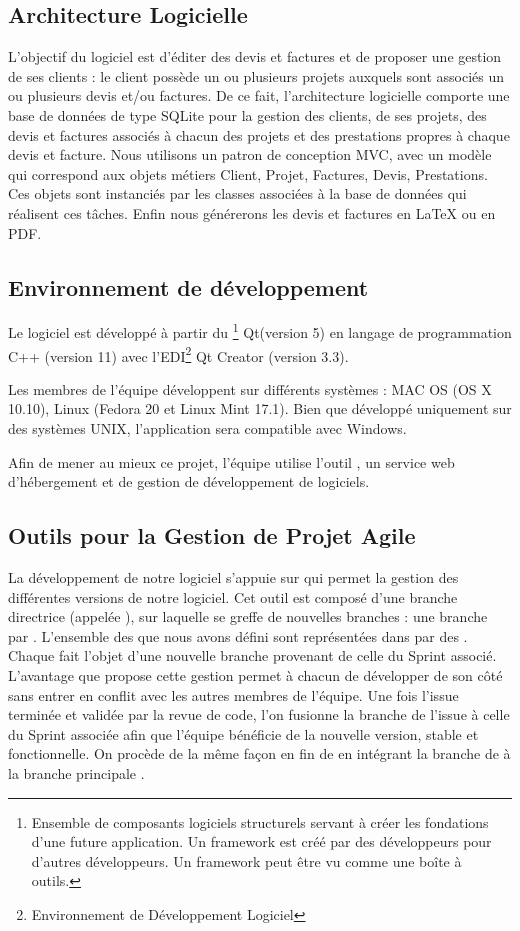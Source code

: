 \subsection{Architecture Logicielle}
L’objectif du logiciel est d’éditer des devis et factures et de proposer une gestion de ses clients : le client possède un ou plusieurs projets auxquels sont associés un ou plusieurs devis et/ou factures. 
De ce fait, l’architecture logicielle comporte une base de données de type SQLite pour la gestion des clients, de ses projets, des devis et factures associés à chacun des projets et des prestations propres à chaque devis et facture. 
Nous utilisons un patron de conception MVC, avec un modèle qui correspond aux objets métiers Client, Projet, Factures, Devis, Prestations. Ces objets sont instanciés par les classes associées à la base de données qui réalisent ces tâches.
Enfin nous générerons les devis et factures en LaTeX ou en PDF.

\subsection{Environnement de développement}
Le logiciel est développé à partir du 
\footnote{Ensemble de composants logiciels structurels servant à créer les fondations d'une future application. Un framework est créé par des développeurs pour d'autres développeurs. Un framework peut être vu comme une boîte à outils.} 
Qt(version 5)
en langage de programmation C++ (version 11) avec l'EDI\footnote{Environnement de Développement Logiciel} Qt Creator (version 3.3). 

Les membres de l’équipe développent sur différents systèmes : MAC OS (OS X 10.10), Linux (Fedora 20 et Linux Mint 17.1). Bien que développé uniquement sur des systèmes UNIX, l’application sera compatible avec Windows. 

Afin de mener au mieux ce projet, l’équipe utilise l’outil , un service web d’hébergement et de gestion de développement de logiciels. 

\subsection{Outils pour la Gestion de Projet Agile}
La développement de notre logiciel s’appuie sur  qui permet la gestion des différentes versions de notre logiciel. 
Cet outil est composé d’une branche directrice (appelée ), sur laquelle se greffe de nouvelles branches : une branche par . L’ensemble des  que nous avons défini sont représentées dans  par des . Chaque  fait l’objet d’une nouvelle branche provenant de celle du Sprint associé. L’avantage que propose cette gestion permet à chacun de développer de son côté sans entrer en conflit avec les autres membres de l’équipe. Une fois l’issue terminée et validée par la revue de code, l’on fusionne la branche de l’issue à celle du Sprint associée afin que l’équipe bénéficie de la nouvelle version, stable et fonctionnelle. On procède de la même façon en fin de  en intégrant la branche de  à la branche principale .

